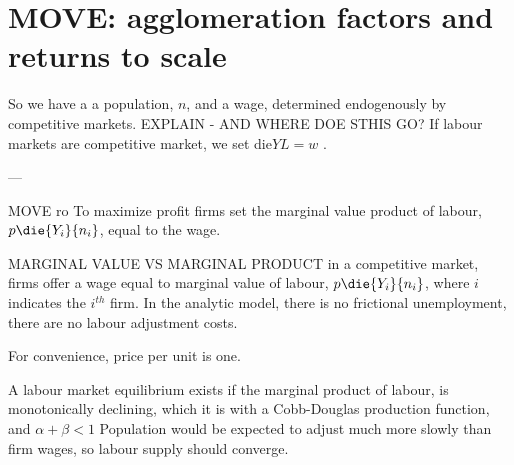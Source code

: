
\section{MOVE: agglomeration factors and returns to scale}

So we have a a population, $n$, and a wage, determined endogenously by competitive markets. 
EXPLAIN - AND WHERE DOE STHIS GO?
If labour markets are \gls{competitive market}, we set die${Y}{L}=w$ .

---

MOVE ro
To maximize profit  firms set the marginal value product of labour, $p\die{Y_i}{n_i}$, 
equal to the wage. 

MARGINAL VALUE VS MARGINAL PRODUCT
in a competitive market, firms offer a wage equal to marginal value of labour, 
 $p\die{Y_i}{n_i}$, where $i$ indicates the $i^{th}$ firm. In the analytic model, there is no \gls{frictional unemployment}, there are no \glspl{labour adjustment cost}. 

 For convenience, price per unit is one. 

A labour market equilibrium exists if the marginal product of labour, is monotonically declining, which it is with a \gls{Cobb-Douglas} production function, and $\alpha + \beta<1$ 
Population would be expected to adjust much more slowly than firm wages, so labour supply should converge.

